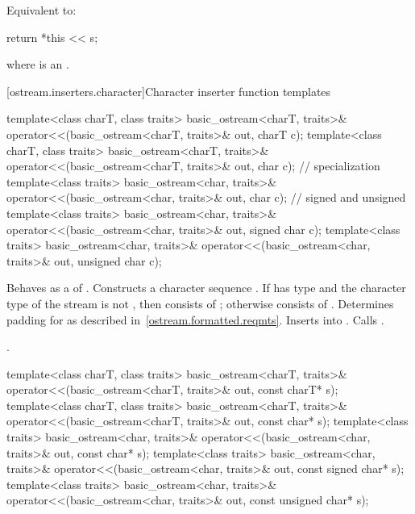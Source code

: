 \begin{itemdescr}
\pnum
\effects
Equivalent to:
\begin{codeblock}
return *this << s;
\end{codeblock}
where  is an
.
\end{itemdescr}

[ostream.inserters.character]{Character inserter function templates}

%
\begin{itemdecl}
template<class charT, class traits>
  basic_ostream<charT, traits>& operator<<(basic_ostream<charT, traits>& out, charT c);
template<class charT, class traits>
  basic_ostream<charT, traits>& operator<<(basic_ostream<charT, traits>& out, char c);
// specialization
template<class traits>
  basic_ostream<char, traits>& operator<<(basic_ostream<char, traits>& out, char c);
// signed and unsigned
template<class traits>
  basic_ostream<char, traits>& operator<<(basic_ostream<char, traits>& out, signed char c);
template<class traits>
  basic_ostream<char, traits>& operator<<(basic_ostream<char, traits>& out, unsigned char c);
\end{itemdecl}

\begin{itemdescr}
\pnum
\effects
Behaves as a 
of . Constructs a character sequence .
If  has type
and the character type of the stream is not
,
then  consists of
;
otherwise  consists of
. Determines padding for  as described
in~\ref{ostream.formatted.reqmts}. Inserts  into
. Calls .

\pnum
\returns
{}.
\end{itemdescr}

%
\begin{itemdecl}
template<class charT, class traits>
  basic_ostream<charT, traits>& operator<<(basic_ostream<charT, traits>& out, const charT* s);
template<class charT, class traits>
  basic_ostream<charT, traits>& operator<<(basic_ostream<charT, traits>& out, const char* s);
template<class traits>
  basic_ostream<char, traits>& operator<<(basic_ostream<char, traits>& out, const char* s);
template<class traits>
  basic_ostream<char, traits>& operator<<(basic_ostream<char, traits>& out, const signed char* s);
template<class traits>
  basic_ostream<char, traits>& operator<<(basic_ostream<char, traits>& out,
                                          const unsigned char* s);
\end{itemdecl}

